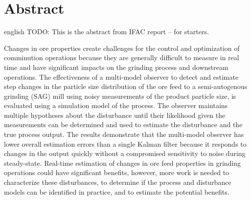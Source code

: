 \chapter*{Abstract}             %
\label{chap-abstract}           %

\begin{otherlanguage*}{english}
  TODO: This is the abstract from IFAC report -- for starters.
  
  Changes in ore properties create challenges for the control and optimization of comminution operations because they are generally difficult to measure in real time and have significant impacts on the grinding process and downstream operations. The effectiveness of a multi-model observer to detect and estimate step changes in the particle size distribution of the ore feed to a semi-autogenous grinding (SAG) mill using noisy measurements of the product particle size, is evaluated using a simulation model of the process. The observer maintains multiple hypotheses about the disturbance until their likelihood given the measurements can be determined and used to estimate the disturbance and the true process output. The results demonstrate that the multi-model observer has lower overall estimation errors than a single Kalman filter because it responds to changes in the output quickly without a compromised sensitivity to noise during steady-state. Real-time estimation of changes in ore feed properties in grinding operations could have significant benefits, however, more work is needed to characterize these disturbances, to determine if the process and disturbance models can be identified in practice, and to estimate the potential benefits.
\end{otherlanguage*}
